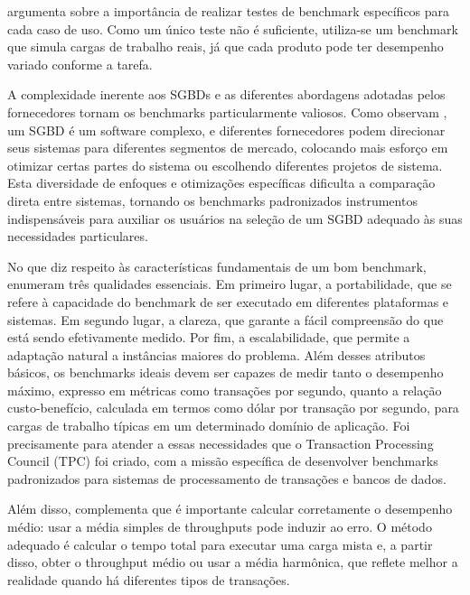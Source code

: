  argumenta sobre a importância de realizar testes de benchmark específicos para cada caso de uso. Como um único teste não é suficiente, utiliza-se um benchmark que simula cargas de trabalho reais, já que cada produto pode ter desempenho variado conforme a tarefa.

A complexidade inerente aos SGBDs e as diferentes abordagens adotadas pelos fornecedores tornam os benchmarks particularmente valiosos. Como observam , um SGBD é um software complexo, e diferentes fornecedores podem direcionar seus sistemas para diferentes segmentos de mercado, colocando mais esforço em otimizar certas partes do sistema ou escolhendo diferentes projetos de sistema. Esta diversidade de enfoques e otimizações específicas dificulta a comparação direta entre sistemas, tornando os benchmarks padronizados instrumentos indispensáveis para auxiliar os usuários na seleção de um SGBD adequado às suas necessidades particulares.

No que diz respeito às características fundamentais de um bom benchmark,  enumeram três qualidades essenciais. Em primeiro lugar, a portabilidade, que se refere à capacidade do benchmark de ser executado em diferentes plataformas e sistemas. Em segundo lugar, a clareza, que garante a fácil compreensão do que está sendo efetivamente medido. Por fim, a escalabilidade, que permite a adaptação natural a instâncias maiores do problema. Além desses atributos básicos, os benchmarks ideais devem ser capazes de medir tanto o desempenho máximo, expresso em métricas como transações por segundo, quanto a relação custo-benefício, calculada em termos como dólar por transação por segundo, para cargas de trabalho típicas em um determinado domínio de aplicação. Foi precisamente para atender a essas necessidades que o Transaction Processing Council (TPC) foi criado, com a missão específica de desenvolver benchmarks padronizados para sistemas de processamento de transações e bancos de dados.

Além disso,  complementa que é importante calcular corretamente o desempenho médio: usar a média simples de throughputs pode induzir ao erro. O método adequado é calcular o tempo total para executar uma carga mista e, a partir disso, obter o throughput médio ou usar a média harmônica, que reflete melhor a realidade quando há diferentes tipos de transações.

